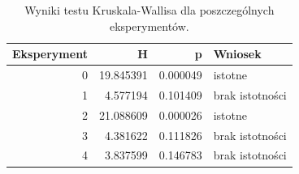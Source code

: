 \begin{table}
\caption{Wyniki testu Kruskala-Wallisa dla poszczególnych eksperymentów.}
\label{tab:kruskal_exp}
\begin{tabular}{rrrl}
\toprule
Eksperyment & H & p & Wniosek \\
\midrule
0 & 19.845391 & 0.000049 & istotne \\
1 & 4.577194 & 0.101409 & brak istotności \\
2 & 21.088609 & 0.000026 & istotne \\
3 & 4.381622 & 0.111826 & brak istotności \\
4 & 3.837599 & 0.146783 & brak istotności \\
\bottomrule
\end{tabular}
\end{table}
